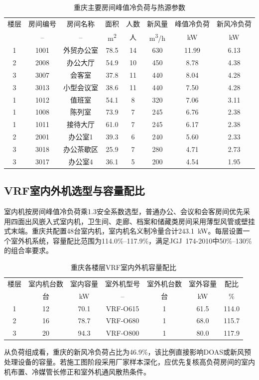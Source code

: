 \begin{table}[!htbp]
\centering
\caption{重庆主要房间峰值冷负荷与热源参数}
\label{tab:chongqing-top-rooms}
\begin{tabular}{@{}cccccccc@{}}
\toprule
楼层 & 房间编号 & 房间名称 & 面积 & 人数 & 新风量 & 峰值冷负荷 & 新风冷负荷 \\
 & -- & -- & \si{m^2} & 人 & \si{m^3/h} & \si{kW} & \si{kW} \\
\midrule
1 & 1001 & 外贸办公室 & 78.5 & 14 & 630 & 11.99 & 6.13 \\
2 & 2008 & 办公大厅 & 54.9 & 10 & 450 & 8.78 & 4.38 \\
3 & 3007 & 会客室 & 37.8 & 11 & 440 & 8.04 & 4.28 \\
3 & 3013 & 小型会议室 & 38.6 & 11 & 440 & 7.50 & 4.28 \\
1 & 1012 & 值班室 & 54.1 & 8 & 320 & 7.06 & 3.11 \\
1 & 1008 & 陈列室 & 73.9 & 7 & 245 & 6.76 & 2.38 \\
1 & 1011 & 接待大厅 & 61.0 & 7 & 245 & 6.17 & 2.38 \\
2 & 2001 & 办公室1 & 39.3 & 6 & 240 & 5.60 & 2.33 \\
3 & 3018 & 办公茶歇区 & 25.9 & 7 & 280 & 4.71 & 2.73 \\
3 & 3017 & 办公室4 & 36.1 & 5 & 200 & 4.54 & 1.95 \\
\bottomrule
\end{tabular}
\end{table}

\subsection{VRF室内外机选型与容量配比}

室内机按房间峰值冷负荷乘1.3安全系数选型，普通办公、会议和会客房间优先采用四面出风嵌入式室内机，卫生间、走廊、档案和储藏类房间采用薄型风管或壁挂式末端。重庆共配置48台室内机，室内机名义制冷量合计\SI{243.1}{kW}。每层设置一个室外机系统，容量配比范围为114.0\%--117.9\%，满足JGJ~174-2010中50\%--130\%的组合率要求。

\begin{table}[!htbp]
\centering
\caption{重庆各楼层VRF室内外机容量配比}
\label{tab:chongqing-vrf-ratio}
\begin{tabular}{@{}ccccccc@{}}
\toprule
楼层 & 室内机台数 & 室内容量 & 室外机型号 & 室外机台数 & 室外容量 & 配比 \\
 & 台 & \si{kW} & -- & 台 & \si{kW} & \% \\
\midrule
1 & 12 & 70.1 & VRF-O615 & 1 & 61.5 & 114.0 \\
2 & 16 & 78.7 & VRF-O680 & 1 & 68.0 & 115.7 \\
3 & 20 & 94.3 & VRF-O800 & 1 & 80.0 & 117.9 \\
\bottomrule
\end{tabular}
\end{table}

从负荷组成看，重庆的新风冷负荷占比为46.9\%，该比例直接影响DOAS或新风预处理设备的容量。若施工图阶段采用厂家样本深化，应优先复核高负荷房间的室内机布置、冷媒管长修正和室外机通风散热条件。
